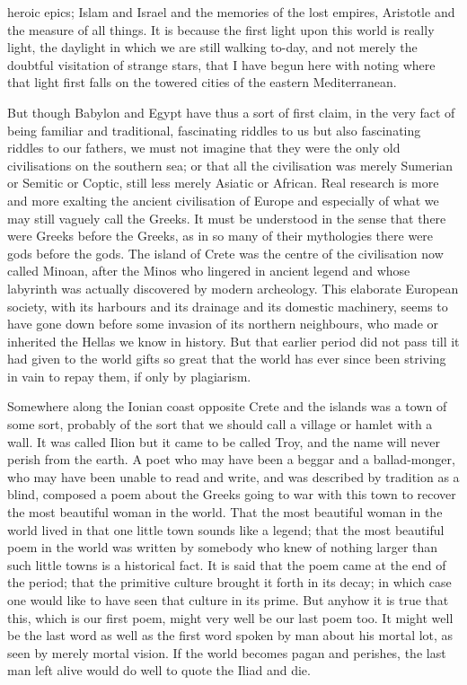 heroic epics; Islam and Israel and the memories of the lost empires, Aristotle and the measure of all things. It is because the first light upon this world is really light, the daylight in which we are still walking to-day, and not merely the doubtful visitation of strange stars, that I have begun here with noting where that light first falls on the towered cities of the eastern Mediterranean.

But though Babylon and Egypt have thus a sort of first claim, in the very fact of being familiar and traditional, fascinating riddles to us but also fascinating riddles to our fathers, we must not imagine that they were the only old civilisations on the southern sea; or that all the civilisation was merely Sumerian or Semitic or Coptic, still less merely Asiatic or African. Real research is more and more exalting the ancient civilisation of Europe and especially of what we may still vaguely call the Greeks. It must be understood in the sense that there were Greeks before the Greeks, as in so many of their mythologies there were gods before the gods. The island of Crete was the centre of the civilisation now called Minoan, after the Minos who lingered in ancient legend and whose labyrinth was actually discovered by modern archeology. This elaborate European society, with its harbours and its drainage and its domestic machinery, seems to have gone down before some invasion of its northern neighbours, who made or inherited the Hellas we know in history. But that earlier period did not pass till it had given to the world gifts so great that the world has ever since been striving in vain to repay them, if only by plagiarism.

Somewhere along the Ionian coast opposite Crete and the islands was a town of some sort, probably of the sort that we should call a village or hamlet with a wall. It was called Ilion but it came to be called Troy, and the name will never perish from the earth. A poet who may have been a beggar and a ballad-monger, who may have been unable to read and write, and was described by tradition as a blind, composed a poem about the Greeks going to war with this town to recover the most beautiful woman in the world. That the most beautiful woman in the world lived in that one little town sounds like a legend; that the most beautiful poem in the world was written by somebody who knew of nothing larger than such little towns is a historical fact. It is said that the poem came at the end of the period; that the primitive culture brought it forth in its decay; in which case one would like to have seen that culture in its prime. But anyhow it is true that this, which is our first poem, might very well be our last poem too. It might well be the last word as well as the first word spoken by man about his mortal lot, as seen by merely mortal vision. If the world becomes pagan and perishes, the last man left alive would do well to quote the Iliad and die.

